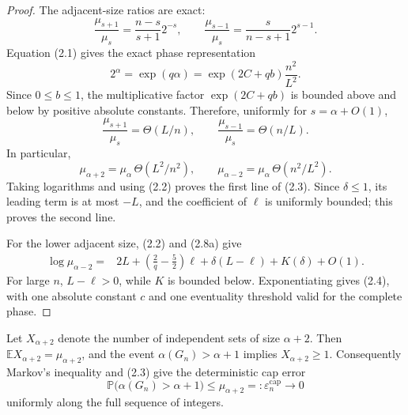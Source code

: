 \begin{proof}
The adjacent-size ratios are exact:
\begin{equation*}
  \frac{\mu_{s+1}}{\mu_s}
  =\frac{n-s}{s+1}2^{-s},
  \qquad
  \frac{\mu_{s-1}}{\mu_s}
  =\frac{s}{n-s+1}2^{s-1}.
  \tag{2.8}
\end{equation*}
Equation (2.1) gives the exact phase representation
\[
  2^\alpha
  =\exp(q\alpha)
  =\exp(2C+qb)\frac{n^2}{L^2}.
\]
Since $0\le b\le1$, the multiplicative factor $\exp(2C+qb)$ is bounded
above and below by positive absolute constants. Therefore, uniformly for
$s=\alpha+O(1)$,
\[
  \frac{\mu_{s+1}}{\mu_s}=\Theta(L/n),
  \qquad
  \frac{\mu_{s-1}}{\mu_s}=\Theta(n/L).
\]
In particular,
\begin{equation*}
  \mu_{\alpha+2}
  =\mu_\alpha\,\Theta(L^2/n^2),
  \qquad
  \mu_{\alpha-2}
  =\mu_\alpha\,\Theta(n^2/L^2).
  \tag{2.8a}
\end{equation*}
Taking logarithms and using (2.2) proves the first line of (2.3). Since
$\delta\le1$, its leading term is at most $-L$, and the coefficient of
$\ell$ is uniformly bounded; this proves the second line.

For the lower adjacent size, (2.2) and (2.8a) give
\[
\begin{split}
  \log\mu_{\alpha-2}
  ={}&2L+\left(\frac2q-\frac52\right)\ell
      +\delta(L-\ell)+K(\delta)+O(1).
\end{split}
\]
For large $n$, $L-\ell>0$, while $K$ is bounded below. Exponentiating gives
(2.4), with one absolute constant $c$ and one eventuality threshold valid for
the complete phase.
\end{proof}

Let $X_{\alpha+2}$ denote the number of independent sets of size
$\alpha+2$. Then
$\mathbb E X_{\alpha+2}=\mu_{\alpha+2}$, and the event
$\alpha(G_n)>\alpha+1$ implies $X_{\alpha+2}\ge1$. Consequently Markov's
inequality and (2.3) give the deterministic cap error
\begin{equation*}
  \mathbb P\bigl(\alpha(G_n)>\alpha+1\bigr)
  \le\mu_{\alpha+2}
  =:\varepsilon_n^{\mathrm{cap}}
  \longrightarrow0
  \tag{2.9}
\end{equation*}
uniformly along the full sequence of integers.